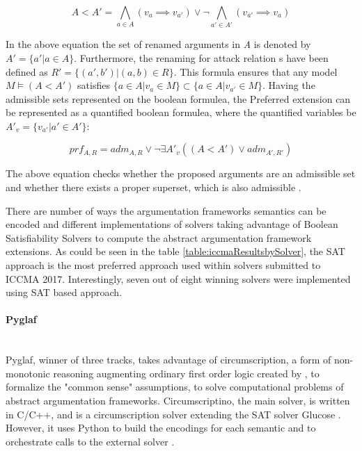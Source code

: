 \begin{equation}
A < A' = \bigwedge\limits_{a \in A} (v_a \implies v_{a'}) \lor \neg \bigwedge\limits_{a' \in A'} (v_{a'} \implies v_a)
\end{equation}

In the above equation the set of renamed arguments in \textit{A} is denoted by $A' = \{a' | a \in A\}$. Furthermore, the renaming for attack relation s have been defined as $R' = \{(a',b') | (a,b) \in R\}$. This formula ensures that any model $ M \models (A < A')$ satisfies $ \{a \in A | v_a \in M\} \subset \{a \in A | v_{a'} \in M\} $. Having the admissible sets represented on the boolean formulea, the Preferred extension can be represented as a quantified boolean formulea, where the quantified variables be $ A'_v = \{v_{a'} | a' \in A'\} $:

\begin{equation}
prf_{A,R} = adm_{A,R} \lor \neg \exists A'_v ((A < A') \lor adm_{A',R'})
\end{equation}

The above equation checks whether the proposed arguments are an admissible set and whether there exists a proper superset, which is also admissible \citep{solvingMethods}.

There are number of ways the argumentation frameworks semantics can be encoded and different implementations of solvers taking advantage of Boolean Satisfiability Solvers to compute the abstract argumentation framework extensions. As could be seen in the table \ref{table:iccmaResultsbySolver}, the SAT approach is the most preferred approach used within solvers submitted to ICCMA 2017. Interestingly, seven out of eight winning solvers were implemented using SAT based approach. 

\paragraph{Pyglaf} \mbox{}\\ \label{section:pyglaf}
Pyglaf, winner of three tracks, takes advantage of circumscription, a form of non-monotonic reasoning augmenting ordinary first order logic created by \citet{circumpscription}, to formalize the "common sense" assumptions, to solve computational problems of abstract argumentation frameworks.  Circumscriptino, the main solver, is written in C/C++, and is a circumscription solver extending the SAT solver Glucose \citep{glucose}. However, it uses Python to build the encodings for each semantic and to orchestrate calls to the external solver \citep{pyglaf}. 

